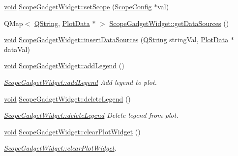 \begin{DoxyCompactItemize}
\hyperlink{group___u_a_v_objects_plugin_ga444cf2ff3f0ecbe028adce838d373f5c}{void} \hyperlink{group___scope_plugin_gaf7086ffcc7a7a1bbcaac30108908ea19}{\-Scope\-Gadget\-Widget\-::set\-Scope} (\hyperlink{class_scope_config}{\-Scope\-Config} $\ast$val)
\item 
\-Q\-Map$<$ \hyperlink{group___u_a_v_objects_plugin_gab9d252f49c333c94a72f97ce3105a32d}{\-Q\-String}, \hyperlink{class_plot_data}{\-Plot\-Data} $\ast$ $>$ \hyperlink{group___scope_plugin_gae23ab8c7b7852bc2ac59639923fb8cfc}{\-Scope\-Gadget\-Widget\-::get\-Data\-Sources} ()
\item 
\hyperlink{group___u_a_v_objects_plugin_ga444cf2ff3f0ecbe028adce838d373f5c}{void} \hyperlink{group___scope_plugin_ga4682e74303bf7b117006e3d61a6827ce}{\-Scope\-Gadget\-Widget\-::insert\-Data\-Sources} (\hyperlink{group___u_a_v_objects_plugin_gab9d252f49c333c94a72f97ce3105a32d}{\-Q\-String} string\-Val, \hyperlink{class_plot_data}{\-Plot\-Data} $\ast$data\-Val)
\item 
\hyperlink{group___u_a_v_objects_plugin_ga444cf2ff3f0ecbe028adce838d373f5c}{void} \hyperlink{group___scope_plugin_ga3f88f383dc322a2516c1e6b874e341a0}{\-Scope\-Gadget\-Widget\-::add\-Legend} ()
\begin{DoxyCompactList}\small\item\em \hyperlink{group___scope_plugin_ga3f88f383dc322a2516c1e6b874e341a0}{\-Scope\-Gadget\-Widget\-::add\-Legend} \-Add legend to plot. \end{DoxyCompactList}\item 
\hyperlink{group___u_a_v_objects_plugin_ga444cf2ff3f0ecbe028adce838d373f5c}{void} \hyperlink{group___scope_plugin_ga16702effa3e6ad5ddf0f94a77e9c430a}{\-Scope\-Gadget\-Widget\-::delete\-Legend} ()
\begin{DoxyCompactList}\small\item\em \hyperlink{group___scope_plugin_ga16702effa3e6ad5ddf0f94a77e9c430a}{\-Scope\-Gadget\-Widget\-::delete\-Legend} \-Delete legend from plot. \end{DoxyCompactList}\item 
\hyperlink{group___u_a_v_objects_plugin_ga444cf2ff3f0ecbe028adce838d373f5c}{void} \hyperlink{group___scope_plugin_ga9a19de9754adbab7df27b7db75348346}{\-Scope\-Gadget\-Widget\-::clear\-Plot\-Widget} ()
\begin{DoxyCompactList}\small\item\em \hyperlink{group___scope_plugin_ga9a19de9754adbab7df27b7db75348346}{\-Scope\-Gadget\-Widget\-::clear\-Plot\-Widget}. \end{DoxyCompactList}\item 

\end{DoxyCompactItemize}
